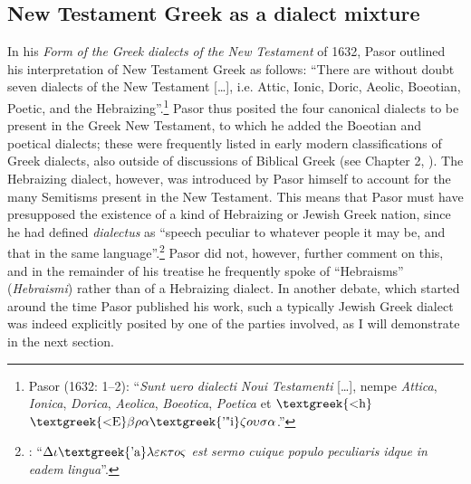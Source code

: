 \documentclass[output=paper]{langsci/langscibook}
\begin{document}
\subsection{New Testament Greek as a dialect mixture}
\hypertarget{Toc19704831}{}
In his \textit{Form} \textit{of} \textit{the} \textit{Greek} \textit{dialects} \textit{of} \textit{the} \textit{New} \textit{Testament} of 1632, Pasor outlined his interpretation of New Testament Greek as follows: “There are without doubt seven dialects of the New Testament […], i.e. Attic, Ionic, Doric, Aeolic, Boeotian, Poetic, and the Hebraizing”.\footnote{Pasor (1632: 1–2): “\textit{Sunt} \textit{uero} \textit{dialecti} \textit{Noui} \textit{Testamenti} […], nempe \textit{Attica}, \textit{Ionica}, \textit{Dorica}, \textit{Aeolica}, \textit{Boeotica}, \textit{Poetica} et $\text{\textgreek{<h}}$ $\text{\textgreek{<E}}\beta \rho \alpha \text{\textgreek{'"i}}\zeta o\upsilon \sigma \alpha $.”} Pasor thus posited the four canonical dialects to be present in the Greek New Testament, to which he added the Boeotian and poetical dialects; these were frequently listed in early modern classifications of Greek dialects, also outside of discussions of Biblical Greek (see Chapter 2, ). The Hebraizing dialect, however, was introduced by Pasor himself to account for the many Semitisms present in the New Testament. This means that Pasor must have presupposed the existence of a kind of Hebraizing or Jewish Greek nation, since he had defined \textit{dialectus} as “speech peculiar to whatever people it may be, and that in the same language”.\footnote{\citet[1]{Pasor1632}: “$\Delta \iota \text{\textgreek{'a}}\lambda \varepsilon \kappa \tau o\varsigma $ \textit{est} \textit{sermo} \textit{cuique} \textit{populo} \textit{peculiaris} \textit{idque} \textit{in} \textit{eadem} \textit{lingua}”.} Pasor did not, however, further comment on this, and in the remainder of his treatise he frequently spoke of “Hebraisms” (\textit{Hebraismi}) rather than of a Hebraizing dialect. In another debate, which started around the time Pasor published his work, such a typically Jewish Greek dialect was indeed explicitly posited by one of the parties involved, as I will demonstrate in the next section.
\end{document}
